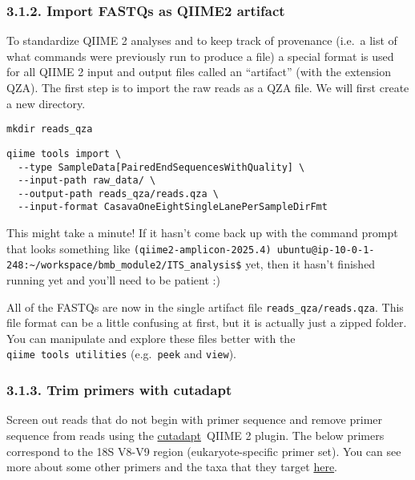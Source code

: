 \documentclass[
]{book}
\begin{document}
\subsubsection{3.1.2. Import FASTQs as QIIME2 artifact}\label{import-fastqs-as-qiime2-artifact-2}

To standardize QIIME 2 analyses and to keep track of provenance (i.e.~a list of what commands were previously run to produce a file) a special format is used for all QIIME 2 input and output files called an ``artifact'' (with the extension QZA). The first step is to import the raw reads as a QZA file. We will first create a new directory.

\begin{verbatim}
mkdir reads_qza
\end{verbatim}

\begin{verbatim}
qiime tools import \
  --type SampleData[PairedEndSequencesWithQuality] \
  --input-path raw_data/ \
  --output-path reads_qza/reads.qza \
  --input-format CasavaOneEightSingleLanePerSampleDirFmt
\end{verbatim}

This might take a minute! If it hasn't come back up with the command prompt that looks something like \texttt{(qiime2-amplicon-2025.4)\ ubuntu@ip-10-0-1-248:\textasciitilde{}/workspace/bmb\_module2/ITS\_analysis\$} yet, then it hasn't finished running yet and you'll need to be patient :)

All of the FASTQs are now in the single artifact file \texttt{reads\_qza/reads.qza}. This file format can be a little confusing at first, but it is actually just a zipped folder. You can manipulate and explore these files better with the \texttt{qiime\ tools\ utilities} (e.g.~\texttt{peek} and \texttt{view}).

\subsubsection{3.1.3. Trim primers with cutadapt}\label{trim-primers-with-cutadapt-2}

Screen out reads that do not begin with primer sequence and remove primer sequence from reads using the \href{http://cutadapt.readthedocs.io/en/stable/guide.html}{cutadapt}~QIIME 2 plugin. The below primers correspond to the 18S V8-V9 region (eukaryote-specific primer set). You can see more about some other primers and the taxa that they target \href{https://imr.bio/protocols.html}{here}.
\end{document}
